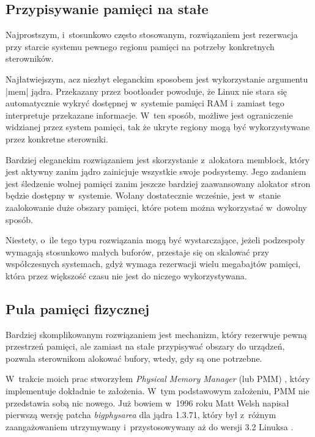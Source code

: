 \subsection{Przypisywanie pamięci na stałe}

Najprostszym, i~stosunkowo często stosowanym, rozwiązaniem jest
rezerwacja przy starcie systemu pewnego regionu pamięci na potrzeby
konkretnych sterowników.

Najłatwiejszym, acz niezbyt eleganckim sposobem jest wykorzystanie
argumentu \code|mem| jądra.  Przekazany przez bootloader powoduje, że
Linux nie stara się automatycznie wykryć dostępnej w~systemie pamięci
RAM i~zamiast tego interpretuje przekazane informacje.  W~ten sposób,
możliwe jest ograniczenie widzianej przez system pamięci, tak że
ukryte regiony mogą być wykorzystywane przez konkretne sterowniki.

Bardziej eleganckim rozwiązaniem jest skorzystanie z~alokatora
memblock, który jest aktywny zanim jądro zainicjuje wszystkie swoje
podsystemy.  Jego zadaniem jest śledzenie wolnej pamięci zanim jeszcze
bardziej zaawansowany alokator stron będzie dostępny w~systemie.
Wołany dostatecznie wcześnie, jest w~stanie zaalokowanie duże obszary
pamięci, które potem można wykorzystać w~dowolny sposób.

Niestety, o~ile tego typu rozwiązania mogą być wystarczające, jeżeli
podzespoły wymagają stosunkowo małych buforów, przestaje się on
skalować przy współczesnych systemach, gdyż wymaga rezerwacji wielu
megabajtów pamięci, która przez większość czasu nie jest do niczego
wykorzystywana.

\subsection{Pula pamięci fizycznej}

Bardziej skomplikowanym rozwiązaniem jest mechanizm, który rezerwuje
pewną przestrzeń pamięci, ale zamiast na stałe przypisywać obszary do
urządzeń, pozwala sterownikom alokować bufory, wtedy, gdy są one
potrzebne.

W~trakcie moich prac stworzyłem {\it Physical Memory Manager} (lub
PMM) \autocite{patch:pmm}, który implementuje dokładnie te
założenia. W~tym podstawowym założeniu, PMM nie przedstawia sobą nic
nowego.  Już bowiem w~1996 roku Matt Welsh napisał pierwszą wersję
patcha \emph{bigphysarea} dla jądra 1.3.71, który był z~różnym
zaangażowaniem utrzymywany i~przystosowywany aż do wersji
3.2 Linuksa \autocite{patch:bigphys}.

